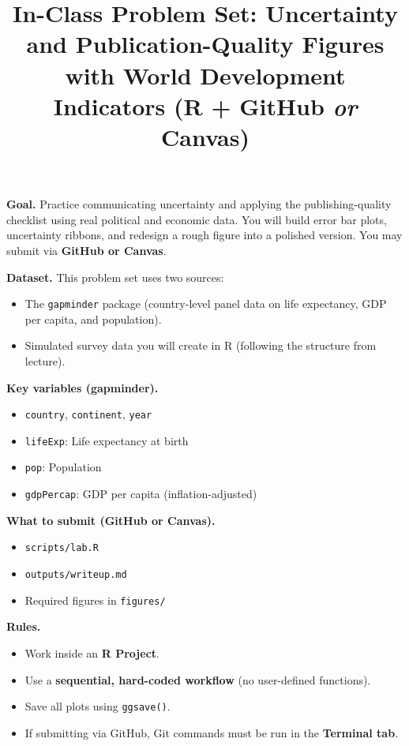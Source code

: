 \documentclass[11pt]{article}
\title{In-Class Problem Set: Uncertainty and Publication-Quality Figures with World Development Indicators (R + GitHub \emph{or} Canvas)}
\author{}
\date{}
\begin{document}
\maketitle

\noindent \textbf{Goal.} Practice communicating uncertainty and applying the publishing-quality checklist using real political and economic data. You will build error bar plots, uncertainty ribbons, and redesign a rough figure into a polished version. You may submit via \textbf{GitHub or Canvas}.

\medskip
\noindent \textbf{Dataset.} This problem set uses two sources:
\begin{itemize}
  \item The \texttt{gapminder} package (country-level panel data on life expectancy, GDP per capita, and population).
  \item Simulated survey data you will create in R (following the structure from lecture).
\end{itemize}

\medskip
\noindent \textbf{Key variables (gapminder).}
\begin{itemize}
  \item \texttt{country}, \texttt{continent}, \texttt{year}
  \item \texttt{lifeExp}: Life expectancy at birth
  \item \texttt{pop}: Population
  \item \texttt{gdpPercap}: GDP per capita (inflation-adjusted)
\end{itemize}

\medskip
\noindent \textbf{What to submit (GitHub or Canvas).}
\begin{itemize}
  \item \texttt{scripts/lab.R}
  \item \texttt{outputs/writeup.md}
  \item Required figures in \texttt{figures/}
\end{itemize}

\medskip
\noindent \textbf{Rules.}
\begin{itemize}
  \item Work inside an \textbf{R Project}.
  \item Use a \textbf{sequential, hard-coded workflow} (no user-defined functions).
  \item Save all plots using \texttt{ggsave()}.
  \item If submitting via GitHub, Git commands must be run in the \textbf{Terminal tab}.
\end{itemize}
\end{document}
